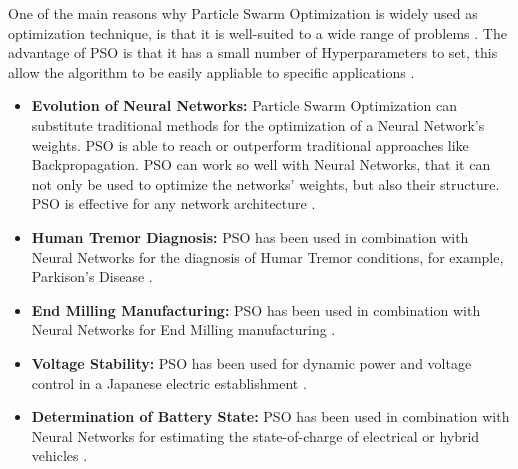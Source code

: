 One of the main reasons why Particle Swarm Optimization is widely used as optimization technique, is that it is well-suited to a wide range of problems \cite{Tesi-3.4}.
The advantage of PSO is that it has a small number of Hyperparameters to set, this allow the algorithm to be easily appliable to specific applications \cite{Tesi-3.4} \cite{Tesi-3.1} \cite{Tesi-3.3} \cite{Tesi-3.5}.
\begin{itemize}[itemsep=0.1cm]
    \item \textbf{Evolution of Neural Networks:} Particle Swarm Optimization can substitute traditional methods for the optimization of a Neural Network's weights.
	PSO is able to reach or outperform traditional approaches like Backpropagation.
	PSO can work so well with Neural Networks, that it can not only be used to optimize the networks' weights, but also their structure. PSO is effective for any network architecture \cite{Tesi-3.4}.
	\item \textbf{Human Tremor Diagnosis:} PSO has been used in combination with Neural Networks for the diagnosis of Humar Tremor conditions, for example, Parkison's Disease \cite{Tesi-3.4}.
	\item \textbf{End Milling Manufacturing:} PSO has been used in combination with Neural Networks for End Milling manufacturing \cite{Tesi-3.4}.
	\item \textbf{Voltage Stability:} PSO has been used for dynamic power and voltage control in a Japanese electric establishment \cite{Tesi-3.4}.
	\item \textbf{Determination of Battery State:} PSO has been used in combination with Neural Networks for estimating the state-of-charge of electrical or hybrid vehicles \cite{Tesi-3.4}.
\end{itemize}

